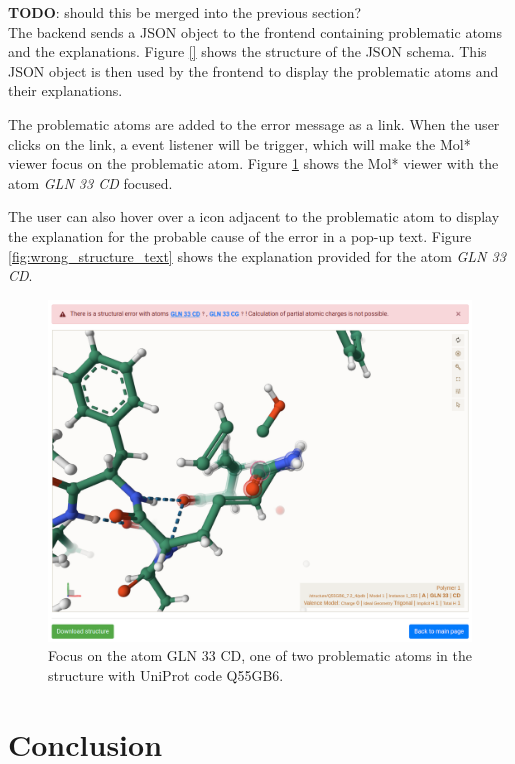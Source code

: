 \documentclass[
  digital,     %
  oneside,     %
  nosansbold,  %
  nocolorbold, %
  lof,         %
  lot,         %
]{fithesis4}
\begin{document}
\textbf{TODO}: should this be merged into the previous section? \\ 

The backend sends a JSON object to the frontend containing problematic atoms and the explanations. Figure \ref{} shows the structure of the JSON schema. This JSON object is then used by the frontend to display the problematic atoms and their explanations.

The problematic atoms are added to the error message as a link. When the user clicks on the link, a event listener will be trigger, which will make the Mol* viewer focus on the problematic atom. Figure \ref{fig:wrong_structure_focus} shows the Mol* viewer with the atom \textit{GLN 33 CD} focused.

The user can also hover over a icon adjacent to the problematic atom to display the explanation for the probable cause of the error in a pop-up text. Figure \ref{fig:wrong_structure_text} shows the explanation provided for the atom \textit{GLN 33 CD}.

\begin{figure}[htbp]
  \begin{center}
    \includegraphics[width=\textwidth]{figures/wrong_structure_focus.png}
  \end{center}
  \caption{Focus on the atom GLN 33 CD, one of two problematic atoms in the structure with UniProt code Q55GB6.}
  \label{fig:wrong_structure_focus}
\end{figure}

\chapter*{Conclusion}

\printbibliography[heading=bibintoc]
\end{document}

